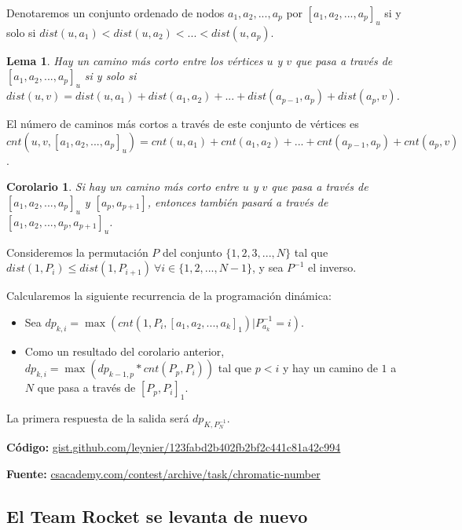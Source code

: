 \documentclass[12pt]{article}
\newcommand{\nl}{\vspace{0.3cm}}
\newtheorem{lemma}{Lema}
\newtheorem{corollary}{Corolario}
\begin{document}
Denotaremos un conjunto ordenado de nodos $a_1, a_2, ..., a_p$ por $[a_1, a_2, ..., a_p]_u$ si y solo si $dist(u, a_1) < dist(u, a_2) < ... < dist(u, a_p)$.

\begin{lemma}
	Hay un camino más corto entre los vértices $u$ y $v$ que pasa a través de $[a_1, a_2, ..., a_p]_u$ si y solo si $dist(u, v) = dist(u, a_1) + dist(a_1, a_2) + ... + dist(a_{p-1}, a_p) + dist(a_p, v)$.
\end{lemma}

El número de caminos más cortos a través de este conjunto de vértices es $cnt(u, v, [a_1, a_2, ..., a_p]_u) = cnt(u, a_1) + cnt(a_1, a_2) + ... + cnt(a_{p-1}, a_p) + cnt(a_p, v)$.

\begin{corollary}
	Si hay un camino más corto entre $u$ y $v$ que pasa a través de $[a_1, a_2, ..., a_p]_u$ y $[a_p,a_{p+1}]$, entonces también pasará a través de $[a_1, a_2, ..., a_p, a_{p+1}]_u$.
\end{corollary}

Consideremos la permutación $P$ del conjunto $\{1,2,3,...,N\}$ tal que $dist(1, P_i) \leqslant dist(1, P_{i+1})\ \forall i \in \{1,2,...,N-1\}$, y sea $P^{-1}$ el inverso.

\nl

Calcularemos la siguiente recurrencia de la programación dinámica:

\begin{itemize}
	\item Sea $dp_{k,i} = \max ( cnt(1, P_i, [a_1, a_2, ..., a_k]_1) | P_{a_k}^{-1} = i )$.
	\item Como un resultado del corolario anterior, $dp_{k,i} = \max ( dp_{k-1,p} * cnt(P_p, P_i))$ tal que $p < i$ y hay un camino de $1$ a $N$ que pasa a través de $[P_p, P_i]_1$.
\end{itemize}

La primera respuesta de la salida será $dp_{K,P_N^{-1}}$.

\nl

\textbf{Código:} \href{https://gist.github.com/leynier/123fabd2b402fb2bf2c441c81a42c994}{gist.github.com/leynier/123fabd2b402fb2bf2c441c81a42c994}

\nl

\textbf{Fuente:} \href{https://csacademy.com/contest/archive/task/chromatic-number}{csacademy.com/contest/archive/task/chromatic-number}

\subsection{El Team Rocket se levanta de nuevo}
\end{document}
